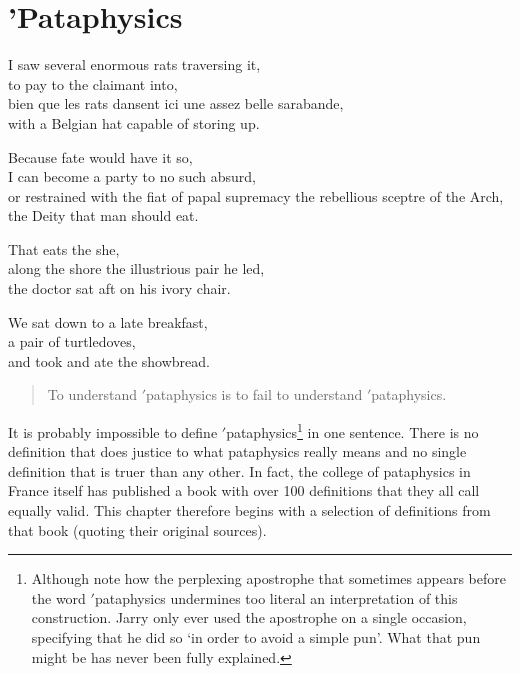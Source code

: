 
\chapter[Pataphysics]{'Pataphysics}
\label{ch:pataphysics}

\startcontents[chapters]

\vfill

I saw several enormous rats traversing it, \\
to pay to the claimant into, \\
bien que les rats dansent ici une assez belle sarabande, \\
with a Belgian hat capable of storing up.

Because fate would have it so, \\
I can become a party to no such absurd, \\
or restrained with the fiat of papal supremacy the rebellious sceptre of the Arch, \\
the Deity that man should eat.

That eats the she, \\
along the shore the illustrious pair he led, \\
the doctor sat aft on his ivory chair.

We sat down to a late breakfast, \\
a pair of turtledoves, \\
and took and ate the showbread.

\newpage
\minicontents
\spirals


\begin{quotation}
  To understand $'$pataphysics is to fail to understand $'$pataphysics. 
\end{quotation}

It is probably impossible to define $'$pataphysics\footnote{Although note how the perplexing apostrophe that sometimes appears before the word $'$pataphysics undermines too literal an interpretation of this construction. Jarry only ever used the apostrophe on a single occasion, specifying that he did so `in order to avoid a simple pun'. What that pun might be has never been fully explained.} in one sentence. There is no definition that does justice to what pataphysics really means and no single definition that is truer than any other. In fact, the college of pataphysics in France itself has published a book \autocite{Brotchie2003} with over 100 definitions that they all call equally valid. This chapter therefore begins with a selection of definitions from that book (quoting their original sources).

